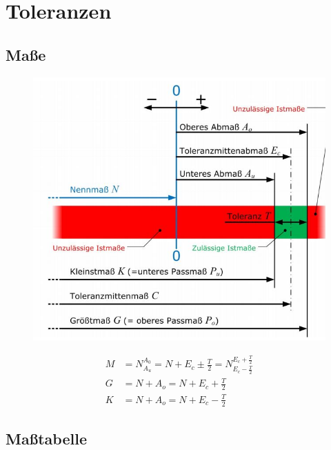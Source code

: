 \newpage

\section{Toleranzen}

\subsection*{Maße}

\begin{figure}[h]
	\centering
	\includegraphics[scale=0.6]{Toleranzen_1.jpg}
\end{figure}

\begin{align*}
M &= N^{A_0}_{A_u} = N + E_c \pm \frac{T}{2} = N^{E_c + \frac{T}{2}}_{E_c - \frac{T}{2}} \\
G &= N + A_o = N + E_c + \frac{T}{2} \\
K &= N + A_o = N + E_c - \frac{T}{2}
\end{align*}

\newpage

\subsection*{Maßtabelle}

